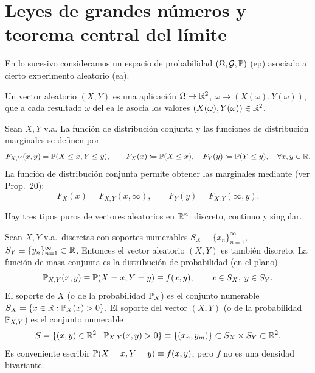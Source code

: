 \chapter{Leyes de grandes números y teorema central del límite}

En lo sucesivo consideramos un espacio de probabilidad $(\Omega, \mathcal{G}, \mathbb{P})$ (ep) asociado a cierto experimento aleatorio (ea).

\begin{definicion}[13]
Un vector aleatorio $(X, Y)$ es una aplicación $\Omega \to \mathbb{R}^2$, $\omega \mapsto (X(\omega), Y(\omega))$, que a cada resultado $\omega$ del ea le asocia los valores $(X(\omega), Y(\omega)) \in \mathbb{R}^2$.
\end{definicion}

\begin{definicion}
Sean $X, Y$ v.a. La función de distribución conjunta y las funciones de distribución marginales se definen por
\[
  F_{X,Y}(x,y) = \mathbb{P}(X \le x, Y \le y), \qquad F_X(x) \coloneqq \mathbb{P}(X \le x), \quad F_Y(y) \coloneqq \mathbb{P}(Y \le y), \quad \forall x,y \in \mathbb{R}.
\]
La función de distribución conjunta permite obtener las marginales mediante (ver Prop.\ 20):
\[
  F_X(x) = F_{X,Y}(x, \infty), \qquad F_Y(y) = F_{X,Y}(\infty, y).
\]
\end{definicion}

Hay tres tipos puros de vectores aleatorios en $\mathbb{R}^n$: discreto, continuo y singular.

\begin{definicion}[15]
Sean $X, Y$ v.a.\ discretas con soportes numerables $S_X \equiv \{x_n\}_{n=1}^\infty$, $S_Y \equiv \{y_n\}_{n=1}^\infty \subset \mathbb{R}$. Entonces el vector aleatorio $(X, Y)$ es también discreto. La función de masa conjunta es la distribución de probabilidad (en el plano)
\begin{equation*}
  \mathbb{P}_{X,Y}(x,y) \equiv \mathbb{P}(X = x, Y = y) \equiv f(x,y), \qquad x \in S_X, \; y \in S_Y.
\end{equation*}
El soporte de $X$ (o de la probabilidad $\mathbb{P}_X$) es el conjunto numerable $S_X = \{x \in \mathbb{R} : \mathbb{P}_X(x) > 0\}$.
El soporte del vector $(X, Y)$ (o de la probabilidad $\mathbb{P}_{X,Y}$) es el conjunto numerable
\[
  S = \{(x,y) \in \mathbb{R}^2 : \mathbb{P}_{X,Y}(x,y) > 0\} \equiv \{(x_n, y_m)\} \subset S_X \times S_Y \subset \mathbb{R}^2.
\]
Es conveniente escribir $\mathbb{P}(X = x, Y = y) \equiv f(x,y)$, pero $f$ no es una densidad bivariante.
\end{definicion}

